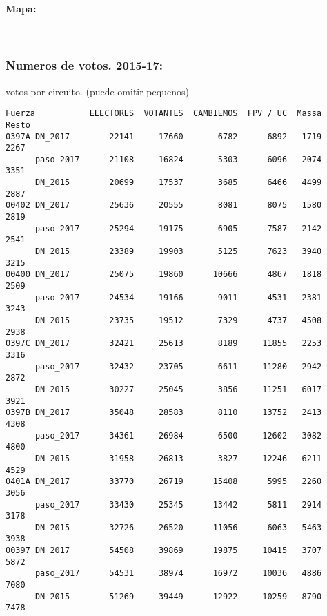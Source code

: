 \documentclass[11pt]{article}
\begin{document}
    
    \hypertarget{mapa}{%
\paragraph{Mapa:}\label{mapa}}

    
    \begin{center}
    \end{center}
    { \hspace*{\fill} \\}
    
    \hypertarget{numeros-de-votos.-2015-17}{%
\subsubsection{Numeros de votos.
2015-17:}\label{numeros-de-votos.-2015-17}}

    
    votos por circuito. (puede omitir pequenos)

    
    
    \begin{verbatim}
Fuerza           ELECTORES  VOTANTES  CAMBIEMOS  FPV / UC  Massa  Resto
0397A DN_2017        22141     17660       6782      6892   1719   2267
      paso_2017      21108     16824       5303      6096   2074   3351
      DN_2015        20699     17537       3685      6466   4499   2887
00402 DN_2017        25636     20555       8081      8075   1580   2819
      paso_2017      25294     19175       6905      7587   2142   2541
      DN_2015        23389     19903       5125      7623   3940   3215
00400 DN_2017        25075     19860      10666      4867   1818   2509
      paso_2017      24534     19166       9011      4531   2381   3243
      DN_2015        23735     19512       7329      4737   4508   2938
0397C DN_2017        32421     25613       8189     11855   2253   3316
      paso_2017      32432     23705       6611     11280   2942   2872
      DN_2015        30227     25045       3856     11251   6017   3921
0397B DN_2017        35048     28583       8110     13752   2413   4308
      paso_2017      34361     26984       6500     12602   3082   4800
      DN_2015        31958     26813       3827     12246   6211   4529
0401A DN_2017        33770     26719      15408      5995   2260   3056
      paso_2017      33430     25345      13442      5811   2914   3178
      DN_2015        32726     26520      11056      6063   5463   3938
00397 DN_2017        54508     39869      19875     10415   3707   5872
      paso_2017      54531     38974      16972     10036   4886   7080
      DN_2015        51269     39449      12922     10259   8790   7478
    \end{verbatim}
\end{document}
